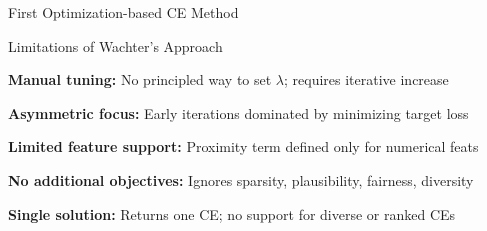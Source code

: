 \documentclass[10pt,compress,t,notes=noshow, xcolor=table]{beamer}
\begin{document}
\begin{framev}[align=top]{First Optimization-based CE Method }
\end{framev}


\begin{framei}[align=top]{Limitations of Wachter's Approach}
\item \textbf{Manual tuning:} No principled way to set $\lambda$; requires iterative increase
\item \textbf{Asymmetric focus:} Early iterations dominated by minimizing target loss
\item \textbf{Limited feature support:} Proximity term defined only for numerical feats
\item \textbf{No additional objectives:} Ignores sparsity, plausibility, fairness, diversity
\item \textbf{Single solution:} Returns one CE; no support for diverse or ranked CEs
\end{framei}
\end{document}
